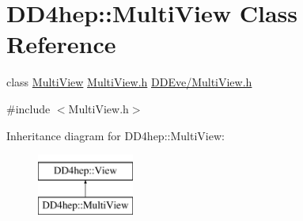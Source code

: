 \hypertarget{class_d_d4hep_1_1_multi_view}{}\section{D\+D4hep\+:\+:Multi\+View Class Reference}
\label{class_d_d4hep_1_1_multi_view}


class \hyperlink{class_d_d4hep_1_1_multi_view}{Multi\+View} \hyperlink{_multi_view_8h}{Multi\+View.\+h} \hyperlink{_multi_view_8h}{D\+D\+Eve/\+Multi\+View.\+h}  




{\ttfamily \#include $<$Multi\+View.\+h$>$}

Inheritance diagram for D\+D4hep\+:\+:Multi\+View\+:\begin{figure}[H]
\begin{center}
\leavevmode
\includegraphics[height=2.000000cm]{class_d_d4hep_1_1_multi_view}
\end{center}
\end{figure}

